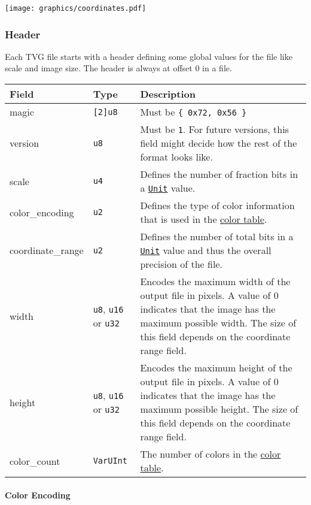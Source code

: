 \documentclass[]{article}
\begin{document}
\begin{center}
  \texttt{[image: graphics/coordinates.pdf]}
\end{center}

\hypertarget{header}{\subsubsection{Header}\label{header}}

Each TVG file starts with a header defining some global values for the
file like scale and image size. The header is always at offset 0 in a
file.

\begin{longtable}[]{@{}p{1in}p{1in}p{4in}@{}}
\toprule
Field & Type & Description \\
\midrule
\endhead
magic & \texttt{{[}2{]}u8} & Must be \texttt{\{\ 0x72,\ 0x56\ \}} \\
version & \texttt{u8} & Must be \texttt{1}. For future versions, this field might decide how the rest of the format looks like. \\
scale & \texttt{u4} & Defines the number of fraction bits in a \protect\hyperlink{units}{\texttt{Unit}} value. \\
color\_encoding & \texttt{u2} & Defines the type of color information that is used in the \protect\hyperlink{color-table}{color table}. \\
coordinate\_range & \texttt{u2} & Defines the number of total bits in a \protect\hyperlink{units}{\texttt{Unit}} value and thus the overall precision of the file. \\
width & \texttt{u8}, \texttt{u16} or \texttt{u32} & Encodes the maximum
width of the output file in pixels. A value of 0 indicates that the image has the maximum possible width. The size of this field depends on the coordinate range field. \\
height & \texttt{u8}, \texttt{u16} or \texttt{u32} & Encodes the maximum height of the output file in pixels. A value of 0 indicates that the image has the maximum possible height. The size of this field depends on the coordinate range field. \\
color\_count & \texttt{VarUInt} & The number of colors in the \protect\hyperlink{color-table}{color table}. \\
\bottomrule
\end{longtable}

\hypertarget{color-encoding}{\paragraph{Color Encoding}\label{color-encoding}}
\end{document}
